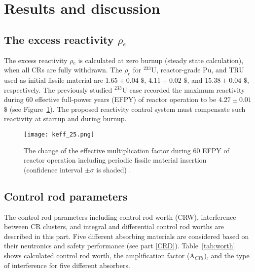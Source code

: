 \section{Results and discussion} \label{Results-and-discussion}

\subsection{The excess reactivity $\rho$$_e$}

The excess reactivity $\rho$$_e$ is calculated at zero burnup (steady state 
calculation), when all CRs are fully withdrawn. The $\rho_e$ for $^{233}$U, 
reactor-grade Pu, and TRU used as initial fissile material are $1.65\pm0.04$ 
$\$$, $4.11\pm0.02$ $\$$, and $15.38\pm0.04$ $\$$, respectively.
The previously studied $^{233}$U case recorded the maximum reactivity
during 60 effective full-power years (EFPY) of reactor operation to be 
$4.27\pm0.01$ $\$$ (see Figure~\ref{fig:keff_25}).
The proposed reactivity control system must compensate such reactivity at startup and during burnup.
\begin{figure}
	\centering
	\texttt{[image: keff\_25.png]}
	\vspace{-0.5in}
	\caption{The change of the effective multiplication factor during 60 EFPY of reactor operation including periodic fissile material insertion (confidence interval $\pm\sigma$ is shaded) \cite{ashraf2020whole}.} 
	\label{fig:keff_25}
\end{figure}

\subsection{Control rod parameters}

The control rod parameters including control rod worth (CRW), interference 
between CR clusters, and integral and differential control rod worths are 
described in this part. Five different absorbing materials are considered based 
on their neutronics and safety performance (see part \ref{CRD}). 
Table~\ref{tab:worth} shows calculated control rod worth, the amplification 
factor (A$_{CRi}$), and the type of interference for five different 
absorbers.

